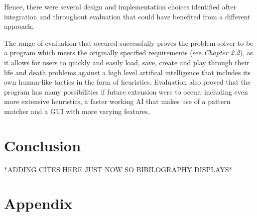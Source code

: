 \documentclass{l3proj}
\begin{document}
Hence, there were several design and implementation choices identified after integration and throughout evaluation that could have benefited from a different approach.

The range of evaluation that occured successfully proves the problem solver to be a program which meets the originally specified requirements (see \textit{Chapter 2.2}), as it allows for users to quickly and easily load, save, create and play through their life and death problems against a high level artifical intelligence that includes its own human-like tactics in the form of heuristics. Evaluation also proved that the program has many possibilities if future extension were to occur, including even more extensive heuristics, a faster working AI that makes use of a pattern matcher and a GUI with more varying features.

\chapter{Conclusion}
\label{conclusion}

*ADDING CITES HERE JUST NOW SO BIBILOGRAPHY DISPLAYS*
\cite{Swing,Graphics,BeginnerGo,GoProbs,AI,MCG, Tromp_2006}




\chapter{Appendix}
\label{appendix}


\end{document}
